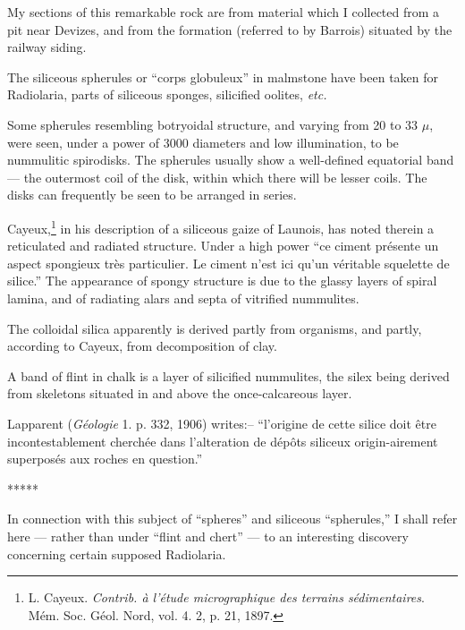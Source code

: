 \documentclass[a4paper, 12pt, oneside]{article}
\begin{document}
My sections of this remarkable rock are from material which I collected from a pit near Devizes, and from the formation (referred to by Barrois) situated by the railway siding.

The siliceous spherules or ``corps globuleux'' in malmstone have been taken for Radiolaria, parts of siliceous sponges, silicified oolites, \emph{etc.}

Some spherules resembling botryoidal structure, and varying from 20 to 33 $\mu$, were seen, under a power of 3000 diameters and low illumination, to be nummulitic spirodisks. The spherules usually show a well-defined equatorial band --- the outermost coil of the disk, within which there will be lesser coils. The disks can frequently be seen to be arranged in series.

Cayeux,\footnote{L. Cayeux. \emph{Contrib. à l'étude micrographique des terrains sédimentaires}. Mém. Soc. Géol. Nord, vol. 4. 2, p. 21, 1897.} in his description of a siliceous gaize of Launois, has noted therein a reticulated and radiated structure. Under a high power ``ce ciment présente un aspect spongieux très particulier. Le ciment n'est ici qu'un véritable squelette de silice.'' The appearance of spongy structure is due to the glassy layers of spiral lamina, and of radiating alars and septa of vitrified nummulites.

The colloidal silica apparently is derived partly from organisms, and partly, according to Cayeux, from decomposition of clay.

A band of flint in chalk is a layer of silicified nummulites, the silex being derived from skeletons situated in and above the once-calcareous layer.

Lapparent (\emph{Géologie} 1. p. 332, 1906) writes:-- ``l'origine de cette silice doit être incontestablement cherchée dans l'alteration de dépôts siliceux origin-airement superposés aux roches en question.''

\centerline{*\hspace{15mm}*\hspace{15mm}*\hspace{15mm}*\hspace{15mm}*}
\bigskip

In connection with this subject of ``spheres'' and siliceous ``spherules,'' I shall refer here --- rather than under ``flint and chert'' --- to an interesting discovery concerning certain supposed Radiolaria.
\end{document}
